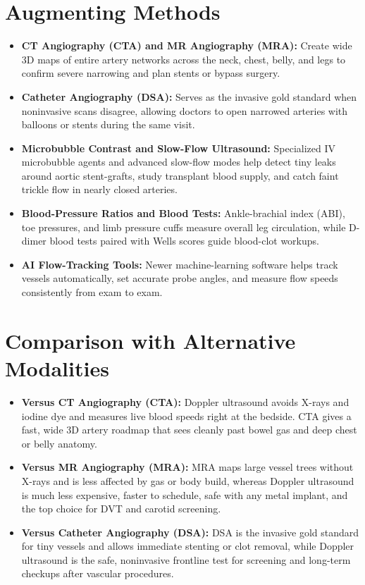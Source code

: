 \section{Augmenting Methods}
\begin{itemize}
\item \textbf{CT Angiography (CTA) and MR Angiography (MRA):} Create wide 3D maps of entire artery networks across the neck, chest, belly, and legs to confirm severe narrowing and plan stents or bypass surgery.
\item \textbf{Catheter Angiography (DSA):} Serves as the invasive gold standard when noninvasive scans disagree, allowing doctors to open narrowed arteries with balloons or stents during the same visit.
\item \textbf{Microbubble Contrast and Slow-Flow Ultrasound:} Specialized IV microbubble agents and advanced slow-flow modes help detect tiny leaks around aortic stent-grafts, study transplant blood supply, and catch faint trickle flow in nearly closed arteries.
\item \textbf{Blood-Pressure Ratios and Blood Tests:} Ankle-brachial index (ABI), toe pressures, and limb pressure cuffs measure overall leg circulation, while D-dimer blood tests paired with Wells scores guide blood-clot workups.
\item \textbf{AI Flow-Tracking Tools:} Newer machine-learning software helps track vessels automatically, set accurate probe angles, and measure flow speeds consistently from exam to exam.
\end{itemize}

\section{Comparison with Alternative Modalities}
\begin{itemize}
\item \textbf{Versus CT Angiography (CTA):} Doppler ultrasound avoids X-rays and iodine dye and measures live blood speeds right at the bedside. CTA gives a fast, wide 3D artery roadmap that sees cleanly past bowel gas and deep chest or belly anatomy.
\item \textbf{Versus MR Angiography (MRA):} MRA maps large vessel trees without X-rays and is less affected by gas or body build, whereas Doppler ultrasound is much less expensive, faster to schedule, safe with any metal implant, and the top choice for DVT and carotid screening.
\item \textbf{Versus Catheter Angiography (DSA):} DSA is the invasive gold standard for tiny vessels and allows immediate stenting or clot removal, while Doppler ultrasound is the safe, noninvasive frontline test for screening and long-term checkups after vascular procedures.
\end{itemize}

